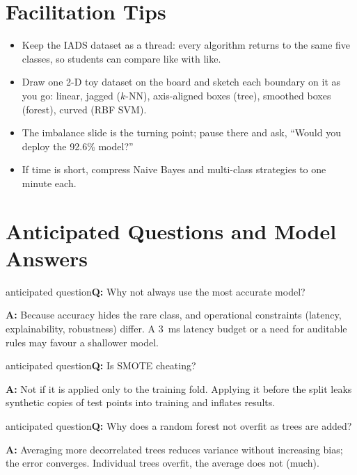 \documentclass[11pt]{article}
\begin{document}
\section{Facilitation Tips}\begin{itemize}\item Keep the IADS dataset as a thread: every algorithm returns to the same five classes, so students can compare like with like.\item Draw one 2-D toy dataset on the board and sketch each boundary on it as you go: linear, jagged ($k$-NN), axis-aligned boxes (tree), smoothed boxes (forest), curved (RBF SVM).\item The imbalance slide is the turning point; pause there and ask, ``Would you deploy the 92.6\% model?''\item If time is short, compress Naive Bayes and multi-class strategies to one minute each.\end{itemize}

\section{Anticipated Questions and Model Answers}

\begin{question}{anticipated question}\textbf{Q:} Why not always use the most accurate model?\par\smallskip\textbf{A:} Because accuracy hides the rare class, and operational constraints (latency, explainability, robustness) differ. A 3~ms latency budget or a need for auditable rules may favour a shallower model.\end{question}

\begin{question}{anticipated question}\textbf{Q:} Is SMOTE cheating?\par\smallskip\textbf{A:} Not if it is applied only to the training fold. Applying it before the split leaks synthetic copies of test points into training and inflates results.\end{question}

\begin{question}{anticipated question}\textbf{Q:} Why does a random forest not overfit as trees are added?\par\smallskip\textbf{A:} Averaging more decorrelated trees reduces variance without increasing bias; the error converges. Individual trees overfit, the average does not (much).\end{question}
\end{document}
